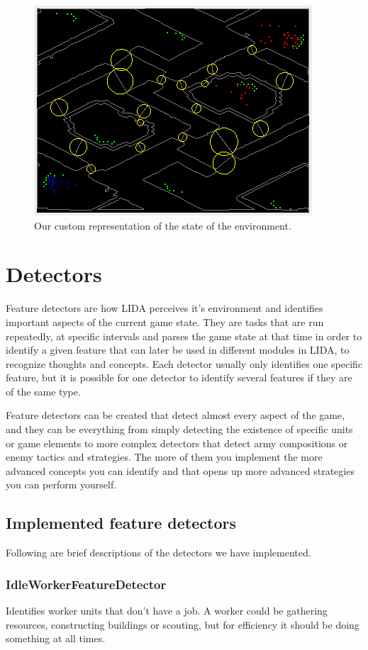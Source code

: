 \begin{figure}[h!tb]
\centering
\includegraphics{graphics/environment-gui.png}
\caption{Our custom representation of the state of the environment.}
\label{fig:environment-gui}
\end{figure}

\section{Detectors}
\label{sec:detectors}
Feature detectors are how LIDA perceives it's environment and identifies important aspects of the current game state. They are tasks that are run repeatedly, at specific intervals and parses the game state at that time in order to identify a given feature that can later be used in different modules in LIDA, to recognize thoughts and concepts. Each detector usually only identifies one specific feature, but it is possible for one detector to identify several features if they are of the same type.

Feature detectors can be created that detect almost every aspect of the game, and they can be everything from simply detecting the existence of specific units or game elements to more complex detectors that detect army compositions or enemy tactics and strategies. The more of them you implement the more advanced concepts you can identify and that opens up more advanced strategies you can perform yourself.

\subsection{Implemented feature detectors}
Following are brief descriptions of the detectors we have implemented.

\subsubsection{IdleWorkerFeatureDetector}
Identifies worker units that don't have a job. A worker could be gathering resources, constructing buildings or scouting, but for efficiency it should be doing something at all times.

